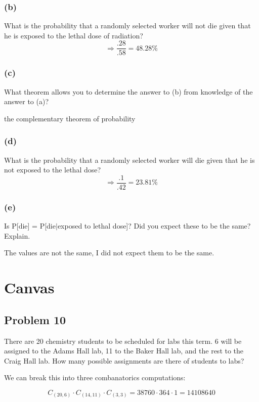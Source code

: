 \documentclass{article}
\begin{document}
\subsubsection*{(b)}
What is the probability that a randomly selected worker will not die given that he is exposed to the lethal dose of radiation?
\begin{equation}
    \Rightarrow \frac{.28}{.58} = \boxed{48.28\%}
\end{equation}
\subsubsection*{(c)}
What theorem allows you to determine the answer to (b) from knowledge of the answer to (a)?
\begin{center}
    the complementary theorem of probability
\end{center}
\subsubsection*{(d)}
What is the probability that a randomly selected worker will die given that he is not exposed to the lethal dose?
\begin{equation}
    \Rightarrow \frac{.1}{.42} = \boxed{23.81\%}
\end{equation}
\subsubsection*{(e)}
Is P[die] = P[die$|$exposed to lethal dose]? Did you expect these to be the same? Explain.
\begin{center}
    The values are not the same, I did not expect them to be the same.
\end{center}
\newpage
\section*{Canvas}
\subsection*{Problem 10}
There are 20 chemistry students to be scheduled for labs this term. 6 will be assigned to the Adams Hall lab, 11 to the Baker Hall lab, and the rest to the Craig Hall lab. How many possible assignments are there of students to labs?
\begin{center}
    We can break this into three combanatorics computations:
\end{center}
\begin{equation}
    C_{(20,6)} \cdot C_{(14,11)} \cdot C_{(3,3)} = 38760 \cdot 364 \cdot 1 = \boxed{14108640}
\end{equation}
\end{document}
